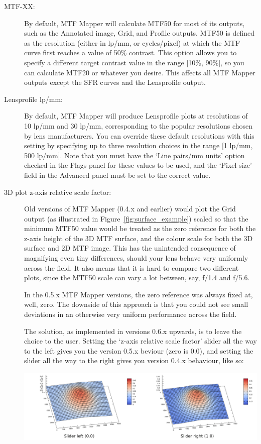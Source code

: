\documentclass[a4paper]{article}
\begin{document}
\begin{description}
\item[MTF-XX:] By default, MTF Mapper will calculate MTF50 for most of its
outputs, such as the \textsf{Annotated image}, \textsf{Grid},
and \textsf{Profile} outputs. MTF50 is defined as the resolution (either in
lp/mm, or cycles/pixel) at which the MTF curve first reaches a value of
50\% contrast. This option allows you to specify a different target contrast
value in the range [10\%, 90\%], so you can calculate MTF20 or whatever you
desire. This affects all MTF Mapper outputs except the SFR curves and the
\textsf{Lensprofile} output.

\item[Lensprofile lp/mm:] By default, MTF Mapper will produce
\textsf{Lensprofile} plots at resolutions of 10 lp/mm and 30 lp/mm,
corresponding to the popular resolutions chosen by lens manufacturers. You can
override these default resolutions with this setting by specifying up to
three resolution choices in the range [1 lp/mm, 500 lp/mm]. Note that you
must have the `Line pairs/mm units' option checked in the \textsf{Flags}
panel for these values to be used, and the `Pixel size' field in the
\textsf{Advanced} panel must be set to the correct value.

\item[3D plot z-axis relative scale factor:]
Old versions of MTF Mapper (0.4.x and earlier) would plot the \textsf{Grid}
output (as illustrated in Figure~\ref{fig:surface_example}) scaled so that
the minimum MTF50 value would be treated as the zero reference for both the
z-axis height of the 3D MTF surface, and the colour scale for both the 3D
surface and 2D MTF image. This has the unintended consequence of magnifying
even tiny differences, should your lens behave very uniformly across the
field. It also means that it is hard to compare two different plots, since
the MTF50 scale can vary a lot between, say, f/1.4 and f/5.6.

In the 0.5.x MTF Mapper versions, the zero reference was always fixed at,
well, zero. The downside of this approach is that you could not see small
deviations in an otherwise very uniform performance across the field.

The solution, as implemented in versions 0.6.x upwards, is to leave the
choice to the user. Setting the `z-axis relative scale factor' slider all
the way to the left gives you the version 0.5.x beviour (zero is 0.0), and setting the
slider all the way to the right gives you version 0.4.x behaviour, like so:

\parbox{0.85\textwidth}{
\centering
\includegraphics[width=\textwidth]{figures/z_axis_scale}
}


\end{description}
\end{document}
